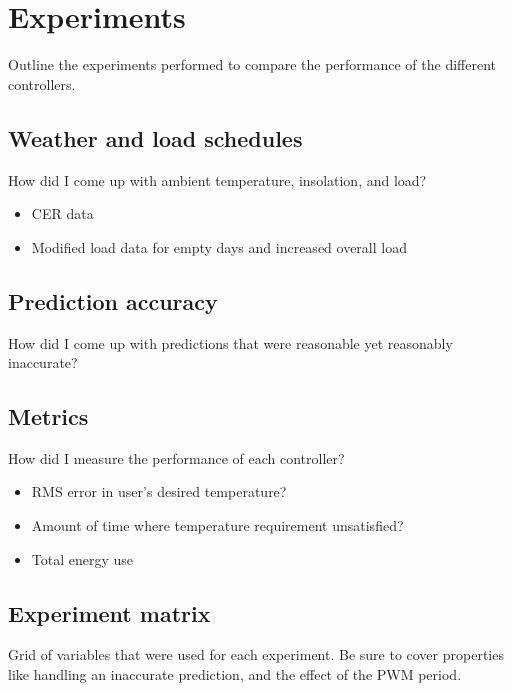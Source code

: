 \chapter{Experiments}
\label{ch:experiments}


Outline the experiments performed to compare the performance of the different controllers.

\section{Weather and load schedules}

How did I come up with ambient temperature, insolation, and load?

\begin{itemize}
	\item CER data
	\item Modified load data for empty days and increased overall load
\end{itemize}

\section{Prediction accuracy}

How did I come up with predictions that were reasonable yet reasonably inaccurate?

\section{Metrics}

How did I measure the performance of each controller?

\begin{itemize}
	\item RMS error in user's desired temperature?
	\item Amount of time where temperature requirement unsatisfied?
	\item Total energy use
\end{itemize}

\section{Experiment matrix}

Grid of variables that were used for each experiment.
Be sure to cover properties like handling an inaccurate prediction, and the effect of the PWM period.
